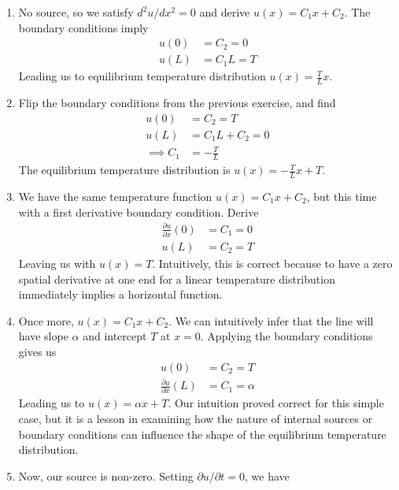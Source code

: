 \documentclass[a4paper]{article}
\begin{document}
\begin{enumerate}[label=(\alph*)]
	\item No source, so we satisfy \( d^{2}u / dx^{2} = 0 \) and derive \( u \!\left( x \right) = C_{1}x + C_{2} \). The boundary conditions imply
	\begin{align*}
		u \!\left( 0 \right) & = C_{2} = 0 \\
		u \!\left( L \right) & = C_{1}L = T
	\end{align*}
	Leading us to equilibrium temperature distribution \( \displaystyle{u \!\left( x \right) = \frac{T}{L}x} \).
	\item Flip the boundary conditions from the previous exercise, and find
	\begin{align*}
		u \!\left( 0 \right) & = C_{2} = T \\
		u \!\left( L \right) & = C_{1}L + C_{2} = 0 \\ 
		      \implies C_{1} & = -\frac{T}{L}
	\end{align*}
	The equilibrium temperature distribution is \( \displaystyle{u \!\left( x \right) = -\frac{T}{L}x + T} \).
	\item We have the same temperature function \( u \!\left( x \right) = C_{1}x + C_{2} \), but this time with a first derivative boundary condition. Derive
	\begin{align*}
		\frac{\partial u}{\partial x}\!\left( 0 \right) & = C_{1} = 0 \\
		u \!\left( L \right) & = C_{2} = T
	\end{align*}
	Leaving us with \( u \!\left( x \right) = T \). Intuitively, this is correct because to have a zero spatial derivative at one end for a linear temperature distribution immediately implies a horizontal function.
	\item Once more, \( u \!\left( x \right) = C_{1}x + C_{2} \). We can intuitively infer that the line will have slope \( \alpha \) and intercept \( T \) at \( x = 0 \). Applying the boundary conditions gives us
	\begin{align*}
		u \!\left( 0 \right) & = C_{2} = T \\
		\frac{\partial u}{\partial x}\!\left( L \right) & = C_{1} = \alpha
	\end{align*}
	Leading us to \( u \!\left( x \right) = \alpha x + T \). Our intuition proved correct for this simple case, but it is a lesson in examining how the nature of internal sources or boundary conditions can influence the shape of the equilibrium temperature distribution.
	\item Now, our source is non-zero. Setting \( \partial u / \partial t = 0 \), we have

\end{enumerate}
\end{document}
